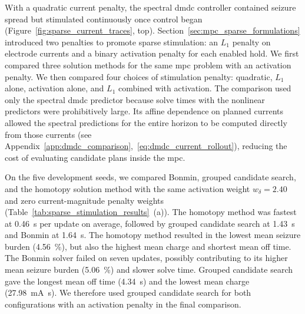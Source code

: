 With a quadratic current penalty, the spectral \ac{dmdc} controller contained seizure spread but stimulated continuously once control began (Figure~\ref{fig:sparse_current_traces}, top).
Section~\ref{sec:mpc_sparse_formulations} introduced two penalties to promote sparse stimulation: an \(L_1\) penalty on electrode currents and a binary activation penalty for each enabled hold.
We first compared three solution methods for the same \ac{mpc} problem with an activation penalty.
We then compared four choices of stimulation penalty: quadratic, \(L_1\) alone, activation alone, and \(L_1\) combined with activation.
The comparison used only the spectral \ac{dmdc} predictor because solve times with the nonlinear predictors were prohibitively large.
Its affine dependence on planned currents allowed the spectral predictions for the entire horizon to be computed directly from those currents (see Appendix~\ref{app:dmdc_comparison},~\eqref{eq:dmdc_current_rollout}), reducing the cost of evaluating candidate plans inside the \ac{mpc}.

On the five development seeds, we compared Bonmin, grouped candidate search, and the homotopy solution method with the same activation weight \(w_\delta=2.40\) and zero current-magnitude penalty weights (Table~\ref{tab:sparse_stimulation_results}~(a)).
The homotopy method was fastest at \SI{0.46}{\second} per update on average, followed by grouped candidate search at \SI{1.43}{\second} and Bonmin at \SI{1.64}{\second}.
The homotopy method resulted in the lowest mean seizure burden (\SI{4.56}{\percent}), but also the highest mean charge and shortest mean off time.
The Bonmin solver failed on seven updates, possibly contributing to its higher mean seizure burden (\SI{5.06}{\percent}) and slower solve time.
Grouped candidate search gave the longest mean off time (\SI{4.34}{\second}) and the lowest mean charge (\SI{27.98}{\milli\ampere\second}).
We therefore used grouped candidate search for both configurations with an activation penalty in the final comparison.

